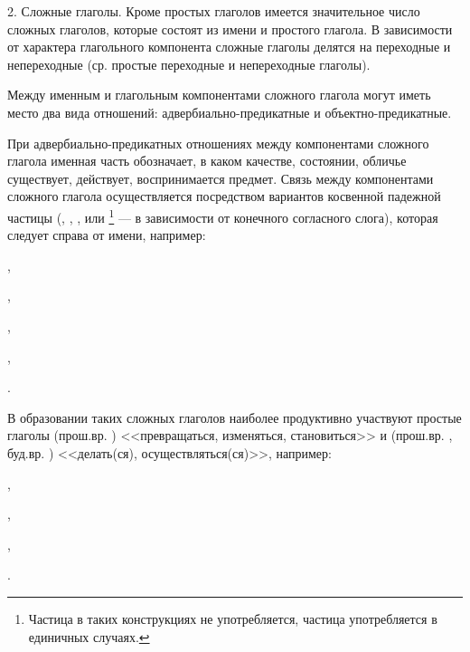2. Сложные глаголы. Кроме простых глаголов имеется значительное число сложных глаголов, которые состоят из имени и простого глагола. В зависимости от характера глагольного компонента сложные глаголы делятся на переходные и непереходные (ср. простые переходные и непереходные глаголы).

Между именным и глагольным ком\-по\-нен\-та\-ми сложного глагола могут иметь место два вида отношений: адвер\-би\-аль\-но-пре\-ди\-кат\-ные и объект\-но-пре\-ди\-кат\-ные.

При адвербиально-предикатных отношениях между компонентами сложного глагола именная часть обозначает, в каком качестве, состоянии, обличье существует, действует, воспринимается предмет. Связь между компонентами сложного глагола осуществляется посредством вариантов косвенной падежной частицы (, , ,  или \footnote[35]{Частица  в таких конструкциях не употребляется, частица  употребляется в единичных случаях.} --- в зависимости от конечного согласного слога), которая следует справа от имени, например:
\begin{prfsample}
	\item {},
	\item {},
	\item {},
	\item {},
	\item {}.
\end{prfsample}

В образовании таких сложных глаголов наиболее продуктивно участвуют простые глаголы  (прош.вр. ) <<превращаться, изменяться, становиться>> и (прош.вр. , буд.вр. ) <<делать(ся), осуществляться(ся)>>, например:
\begin{prfsample}
	\item {},
	\item {},
	\item {},
	\item {}.
\end{prfsample}

